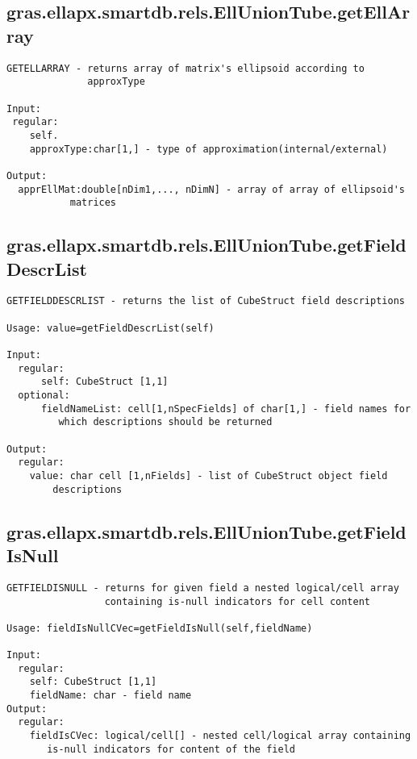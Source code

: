 \subsection{\texorpdfstring{gras.ellapx.smartdb.rels.EllUnionTube.getEllArray}{getEllArray}}\label{method:gras.ellapx.smartdb.rels.EllUnionTube.getEllArray}
\begin{verbatim}
GETELLARRAY - returns array of matrix's ellipsoid according to
              approxType

Input:
 regular:
    self.
    approxType:char[1,] - type of approximation(internal/external)

Output:
  apprEllMat:double[nDim1,..., nDimN] - array of array of ellipsoid's
           matrices
\end{verbatim}
\subsection{\texorpdfstring{gras.ellapx.smartdb.rels.EllUnionTube.getFieldDescrList}{getFieldDescrList}}\label{method:gras.ellapx.smartdb.rels.EllUnionTube.getFieldDescrList}
\begin{verbatim}
GETFIELDDESCRLIST - returns the list of CubeStruct field descriptions

Usage: value=getFieldDescrList(self)

Input:
  regular:
      self: CubeStruct [1,1]
  optional:
      fieldNameList: cell[1,nSpecFields] of char[1,] - field names for
         which descriptions should be returned

Output:
  regular:
    value: char cell [1,nFields] - list of CubeStruct object field
        descriptions
\end{verbatim}
\subsection{\texorpdfstring{gras.ellapx.smartdb.rels.EllUnionTube.getFieldIsNull}{getFieldIsNull}}\label{method:gras.ellapx.smartdb.rels.EllUnionTube.getFieldIsNull}
\begin{verbatim}
GETFIELDISNULL - returns for given field a nested logical/cell array
                 containing is-null indicators for cell content

Usage: fieldIsNullCVec=getFieldIsNull(self,fieldName)

Input:
  regular:
    self: CubeStruct [1,1]
    fieldName: char - field name
Output:
  regular:
    fieldIsCVec: logical/cell[] - nested cell/logical array containing
       is-null indicators for content of the field
\end{verbatim}
